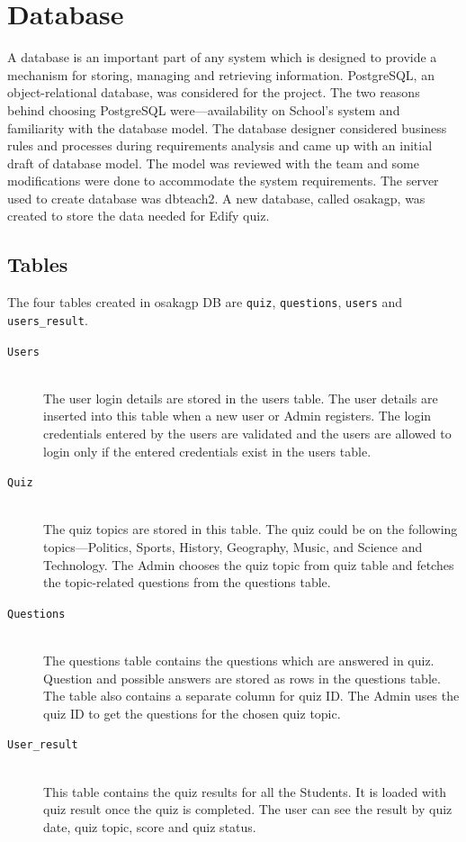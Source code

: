 \section{Database}
\label{sec:database}

A database is an important part of any system which is designed to provide a
mechanism for storing, managing and retrieving information. PostgreSQL, an
object-relational database, was considered for the project. The two reasons
behind choosing PostgreSQL were---availability on School's system and
familiarity with the database model. The database designer considered business
rules and processes during requirements analysis and came up with an initial
draft of database model. The model was reviewed with the team and some
modifications were done to accommodate the system requirements. The server used
to create database was dbteach2. A new database, called osakagp, was created to
store the data needed for Edify quiz.

\subsection{Tables}
\label{sub:tables}

The four tables created in osakagp DB are \verb+quiz+, \verb+questions+,
\verb+users+ and \verb+users_result+.

\begin{description}

	\item[\texttt{Users}] \hfill \\ The user login details are stored in the
		users table. The user details are inserted into this table when a new
		user or Admin registers. The login credentials entered by the users are
		validated and the users are allowed to login only if the entered
		credentials exist in the users table.

	\item[\texttt{Quiz}] \hfill \\ The quiz topics are stored in this table.
		The quiz could be on the following topics---Politics, Sports, History,
		Geography, Music, and Science and Technology. The Admin chooses the
		quiz topic from quiz table and fetches the topic-related questions from
		the questions table.

	\item[\texttt{Questions}] \hfill \\ The questions table contains the
		questions which are answered in quiz. Question and possible answers
		are stored as rows in the questions table. The table also contains a
		separate column for quiz ID\@. The Admin uses the quiz ID to get the
		questions for the chosen quiz topic.

	\item[\texttt{User\_result}] \hfill \\ This table contains the quiz results
		for all the Students. It is loaded with quiz result once the quiz is
		completed. The user can see the result by quiz date, quiz topic, score
		and quiz status.

\end{description}

